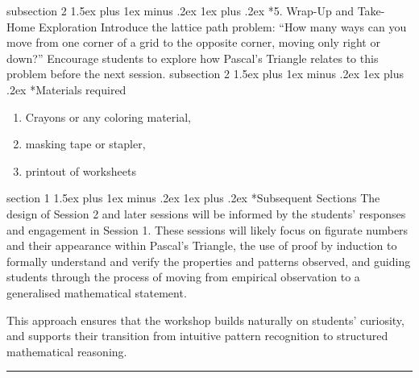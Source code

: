 \documentclass[a4paper,twoside,notitlepage,
11pt,
]{amsart}
\makeatletter
\renewcommand{\section}{\@startsection
  {section}%
  {1}%
  {\z@}%
  {1.5ex plus 1ex minus .2ex}%
  {1ex plus .2ex}%
  {\normalfont\bfseries}}%
\renewcommand{\subsection}{\@startsection
    {subsection}%
    {2}%
    {\z@}%
    {1.5ex plus 1ex minus .2ex}%
    {1ex plus .2ex}%
    {\normalfont\itshape}}%
\makeatother
\begin{document}
\subsection*{5. Wrap-Up and Take-Home Exploration}
Introduce the lattice path problem: ``How many ways can you move from one corner of a grid to the opposite corner, moving only right or down?'' Encourage students to explore how Pascal's Triangle relates to this problem before the next session.
\subsection*{Materials required}
\begin{enumerate}
    \item Crayons or any coloring material,
    \item masking tape or stapler,
    \item printout of worksheets
\end{enumerate}
\section*{Subsequent Sections}
The design of Session 2 and later sessions will be informed by the students' responses and engagement in Session 1. These sessions will likely focus on figurate numbers and their appearance within Pascal's Triangle, the use of proof by induction to formally understand and verify the properties and patterns observed, and guiding students through the process of moving from empirical observation to a generalised mathematical statement.

This approach ensures that the workshop builds naturally on students' curiosity, and supports their transition from intuitive pattern recognition to structured mathematical reasoning.
\hrule
\end{document}
